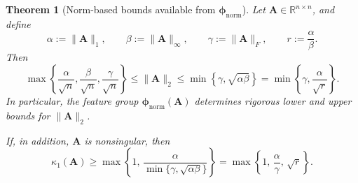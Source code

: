 \documentclass[11pt,a4paper]{article}
\theoremstyle{plain}
\newtheorem{theorem}{Theorem}[section]
\theoremstyle{definition}
\theoremstyle{remark}
\begin{document}
\begin{theorem}[Norm-based bounds available from $\bm{\phi}_{\mathrm{norm}}$]
\label{thm:norm_feature_bounds}
Let $\mathbf{A}\in\mathbb{R}^{n\times n}$, and define
\begin{equation*}
\alpha:=\|\mathbf{A}\|_1,\qquad
\beta:=\|\mathbf{A}\|_\infty,\qquad
\gamma:=\|\mathbf{A}\|_F,\qquad
r:=\frac{\alpha}{\beta}.
\end{equation*}
Then
\begin{equation}
\label{eq:two_norm_interval}
\max\!\left\{\frac{\alpha}{\sqrt{n}},\frac{\beta}{\sqrt{n}},\frac{\gamma}{\sqrt{n}}\right\}
\le
\|\mathbf{A}\|_2
\le
\min\!\left\{\gamma,\sqrt{\alpha\beta}\right\}
=
\min\!\left\{\gamma,\frac{\alpha}{\sqrt{r}}\right\}.
\end{equation}
In particular, the feature group $\bm{\phi}_{\mathrm{norm}}(\mathbf{A})$ determines rigorous lower and upper bounds for $\|\mathbf{A}\|_2$.

If, in addition, $\mathbf{A}$ is nonsingular, then
\begin{equation}
\label{eq:kappa1_lower_from_norm_features}
\kappa_1(\mathbf{A})
\ge
\max\!\left\{
1,\,
\frac{\alpha}{\min\{\gamma,\sqrt{\alpha\beta}\}}
\right\}
=
\max\!\left\{
1,\,
\frac{\alpha}{\gamma},\,
\sqrt{r}
\right\}.
\end{equation}
\end{theorem}
\end{document}
